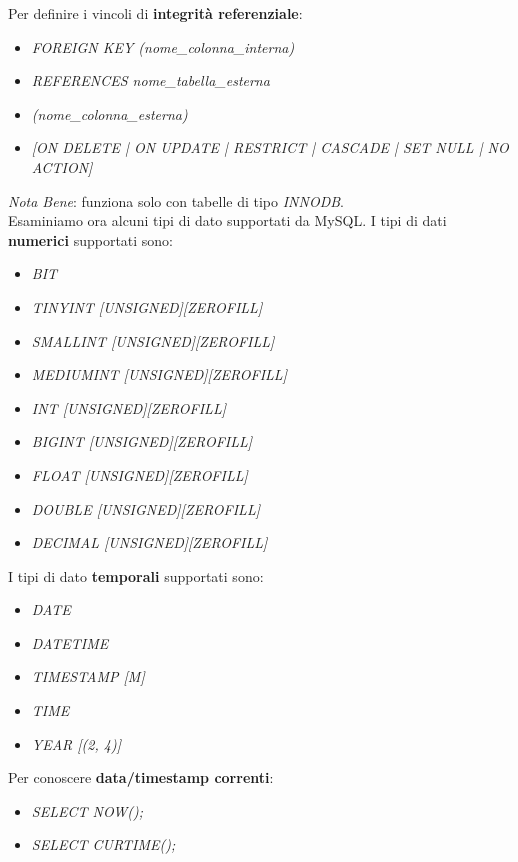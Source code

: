 \documentclass{article}
\begin{document}
Per definire i vincoli di \textbf{integrità referenziale}:
\begin{itemize}[label={ }, leftmargin=1cm]
    \item \textit{FOREIGN KEY (nome\_colonna\_interna)}
    \item \textit{REFERENCES nome\_tabella\_esterna}
    \item \textit{(nome\_colonna\_esterna)}
    \item \textit{[ON DELETE | ON UPDATE | RESTRICT | CASCADE | SET NULL | NO ACTION]}
\end{itemize}
\textit{Nota Bene}: funziona solo con tabelle di tipo \textit{INNODB}.\vspace{14pt}\\
Esaminiamo ora alcuni tipi di dato supportati da MySQL. I tipi di dati \textbf{numerici} supportati sono:
\begin{itemize}[label={ }, leftmargin=1cm]
    \item \textit{BIT}
    \item \textit{TINYINT [UNSIGNED][ZEROFILL]}
    \item \textit{SMALLINT [UNSIGNED][ZEROFILL]}
    \item \textit{MEDIUMINT [UNSIGNED][ZEROFILL]}
    \item \textit{INT [UNSIGNED][ZEROFILL]}
    \item \textit{BIGINT [UNSIGNED][ZEROFILL]}
    \item \textit{FLOAT [UNSIGNED][ZEROFILL]}
    \item \textit{DOUBLE [UNSIGNED][ZEROFILL]}
    \item \textit{DECIMAL [UNSIGNED][ZEROFILL]}
\end{itemize}
I tipi di dato \textbf{temporali} supportati sono:
\begin{itemize}[label={ }, leftmargin=1cm]
    \item \textit{DATE}
    \item \textit{DATETIME}
    \item \textit{TIMESTAMP [M]}
    \item \textit{TIME}
    \item \textit{YEAR [(2, 4)]}
\end{itemize}
Per conoscere \textbf{data/timestamp correnti}:
\begin{itemize}[label={ }, leftmargin=1cm]
    \item \textit{SELECT NOW();}
    \item \textit{SELECT CURTIME();}
\end{itemize}
\end{document}
